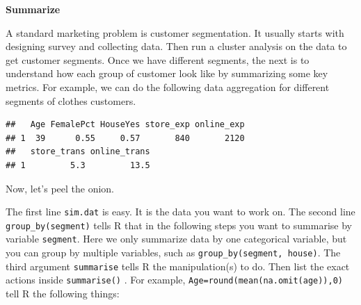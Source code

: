 \documentclass[12pt,]{krantz}
\makeatletter
\newenvironment{Shaded}{\begin{snugshade}}{\end{snugshade}}
\newcommand{\DataTypeTok}[1]{\textcolor[rgb]{0.27,0.27,0.27}{#1}}
\newcommand{\DecValTok}[1]{\textcolor[rgb]{0.06,0.06,0.06}{#1}}
\newcommand{\FloatTok}[1]{\textcolor[rgb]{0.06,0.06,0.06}{#1}}
\newcommand{\KeywordTok}[1]{\textcolor[rgb]{0.27,0.27,0.27}{\textbf{#1}}}
\newcommand{\NormalTok}[1]{#1}
\newcommand{\OperatorTok}[1]{\textcolor[rgb]{0.43,0.43,0.43}{\textbf{#1}}}
\newcommand{\StringTok}[1]{\textcolor[rgb]{0.5,0.5,0.5}{#1}}
\newenvironment{kframe}{%
\medskip{}
\setlength{\fboxsep}{.8em}
 \def\at@end@of@kframe{}%
 \ifinner\ifhmode%
  \def\at@end@of@kframe{\end{minipage}}%
  \begin{minipage}{\columnwidth}%
 \fi\fi%
 \def\FrameCommand##1{\hskip\@totalleftmargin \hskip-\fboxsep
 \colorbox{shadecolor}{##1}\hskip-\fboxsep
     \hskip-\linewidth \hskip-\@totalleftmargin \hskip\columnwidth}%
 \MakeFramed {\advance\hsize-\width
   \@totalleftmargin\z@ \linewidth\hsize
   \@setminipage}}%
 {\par\unskip\endMakeFramed%
 \at@end@of@kframe}
\renewenvironment{Shaded}{\begin{kframe}}{\end{kframe}}
\makeatother
\begin{document}
\textbf{Summarize}

A standard marketing problem is customer segmentation. It usually starts with designing survey and collecting data. Then run a cluster analysis on the data to get customer segments. Once we have different segments, the next is to understand how each group of customer look like by summarizing some key metrics. For example, we can do the following data aggregation for different segments of clothes customers.

\begin{Shaded}
\end{Shaded}

\begin{verbatim}
##   Age FemalePct HouseYes store_exp online_exp
## 1  39      0.55     0.57       840       2120
##   store_trans online_trans
## 1         5.3         13.5
\end{verbatim}

Now, let's peel the onion.

The first line \texttt{sim.dat} is easy. It is the data you want to work on. The second line \texttt{group\_by(segment)} tells R that in the following steps you want to summarise by variable \texttt{segment}. Here we only summarize data by one categorical variable, but you can group by multiple variables, such as \texttt{group\_by(segment,\ house)}. The third argument \texttt{summarise} tells R the manipulation(s) to do. Then list the exact actions inside \texttt{summarise()} . For example, \texttt{Age=round(mean(na.omit(age)),0)} tell R the following things:
\end{document}
